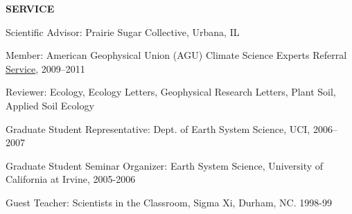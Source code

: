 \documentclass[10pt,twoside]{article}
\begin{document}

\textbf{SERVICE}
\begin{itemize*}
\item Scientific Advisor: Prairie Sugar Collective, Urbana, IL
\item Member: American Geophysical Union (AGU) Climate Science Experts Referral \href{http://www.agu.org/news/press/pr_archives/2010/2010-14.shtml}{Service}, 2009--2011
\item Reviewer: Ecology, Ecology Letters, Geophysical Research Letters,  Plant Soil, Applied Soil Ecology %
\item Graduate Student Representative: Dept. of Earth System Science, UCI, 2006--2007
\item Graduate Student Seminar Organizer: Earth System Science, University of California at Irvine, 2005-2006
\item Guest Teacher: Scientists in the Classroom, Sigma Xi, Durham, NC. 1998-99
\end{itemize*}
\end{document}
